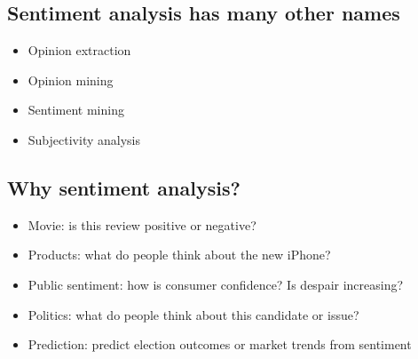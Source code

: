\documentclass[11pt]{article}
\theoremstyle{definition}
\begin{document}
\subsection{Sentiment analysis has many other names}
\begin{itemize}
  \item Opinion extraction
  \item Opinion mining
  \item Sentiment mining
  \item Subjectivity analysis
\end{itemize}

\subsection{Why sentiment analysis?}
\begin{itemize}
  \item Movie: is this review positive or negative?
  \item Products: what do people think about the new iPhone?
  \item Public sentiment: how is consumer confidence? Is despair
  increasing?
  \item Politics: what do people think about this candidate or issue?
  \item Prediction: predict election outcomes or market trends from
  sentiment
\end{itemize}
\end{document}
